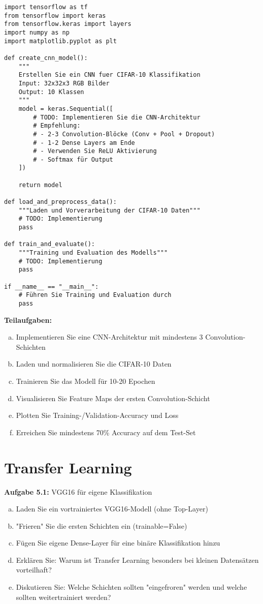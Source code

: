 \documentclass[12pt,a4paper]{article}
\begin{document}
\begin{lstlisting}[caption=CNN für CIFAR-10]
import tensorflow as tf
from tensorflow import keras
from tensorflow.keras import layers
import numpy as np
import matplotlib.pyplot as plt

def create_cnn_model():
    """
    Erstellen Sie ein CNN fuer CIFAR-10 Klassifikation
    Input: 32x32x3 RGB Bilder
    Output: 10 Klassen
    """
    model = keras.Sequential([
        # TODO: Implementieren Sie die CNN-Architektur
        # Empfehlung:
        # - 2-3 Convolution-Blöcke (Conv + Pool + Dropout)
        # - 1-2 Dense Layers am Ende
        # - Verwenden Sie ReLU Aktivierung
        # - Softmax für Output
    ])
    
    return model

def load_and_preprocess_data():
    """Laden und Vorverarbeitung der CIFAR-10 Daten"""
    # TODO: Implementierung
    pass

def train_and_evaluate():
    """Training und Evaluation des Modells"""
    # TODO: Implementierung
    pass

if __name__ == "__main__":
    # Führen Sie Training und Evaluation durch
    pass
\end{lstlisting}

\textbf{Teilaufgaben:}
\begin{enumerate}[(a)]
    \item Implementieren Sie eine CNN-Architektur mit mindestens 3 Convolution-Schichten
    \item Laden und normalisieren Sie die CIFAR-10 Daten
    \item Trainieren Sie das Modell für 10-20 Epochen
    \item Visualisieren Sie Feature Maps der ersten Convolution-Schicht
    \item Plotten Sie Training-/Validation-Accuracy und Loss
    \item Erreichen Sie mindestens 70\% Accuracy auf dem Test-Set
\end{enumerate}

\section{Transfer Learning}

\textbf{Aufgabe 5.1:} VGG16 für eigene Klassifikation

\begin{enumerate}[(a)]
    \item Laden Sie ein vortrainiertes VGG16-Modell (ohne Top-Layer)
    \item "Frieren" Sie die ersten Schichten ein (trainable=False)
    \item Fügen Sie eigene Dense-Layer für eine binäre Klassifikation hinzu
    \item Erklären Sie: Warum ist Transfer Learning besonders bei kleinen Datensätzen vorteilhaft?
    \item Diskutieren Sie: Welche Schichten sollten "eingefroren" werden und welche sollten weitertrainiert werden?
\end{enumerate}
\end{document}
